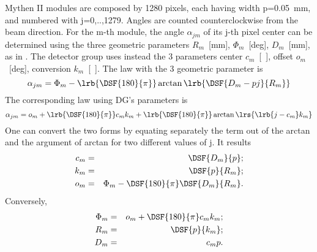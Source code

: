





Mythen II modules are composed by 1280 pixels, each having width p=0.05~mm, and numbered with j=0,..,1279. 
Angles are counted counterclockwise from the beam direction. For the m-th module, the angle $\alpha_{jm}$ of its j-th pixel center 
can be determined using the three geometric parameters $R_m$~[mm], $\Phi_m$~[deg], $D_m$~[mm], as in . 
The detector group uses instead the 3 parameters center $c_m$~[\ ], offset $o_m$~[deg], conversion $k_m$~[\ ]. 
The law with the 3 geometric parameter is
\begin{equation}
\alpha_{jm}=\Phi_m-\lrb{\DSF{180}{\pi}}\arctan\lrb{\DSF{D_m-pj}{R_m}}
\end{equation}
The corresponding law using DG's parameters is
\begin{equation}
\alpha_{jm}=o_m+\lrb{\DSF{180}{\pi}}c_mk_m+\lrb{\DSF{180}{\pi}}\arctan\lrs{\lrb{j-c_m}k_m}
\end{equation}
One can convert the two forms by equating separately the term out of the arctan and the argument of arctan for two different values of j. 
It results
\begin{eqnarray}
c_m&=&\DSF{D_m}{p};\\ 
k_m&=&\DSF{p}{R_m};\\ 
o_m&=&\Phi_m-\DSF{180}{\pi}\DSF{D_m}{R_m}.
\end{eqnarray}
Conversely,
\begin{eqnarray}
\Phi_m&=&o_m+\DSF{180}{\pi}c_mk_m;\\
R_m&=&\DSF{p}{k_m};\\
D_m&=&c_m p.
\end{eqnarray}
